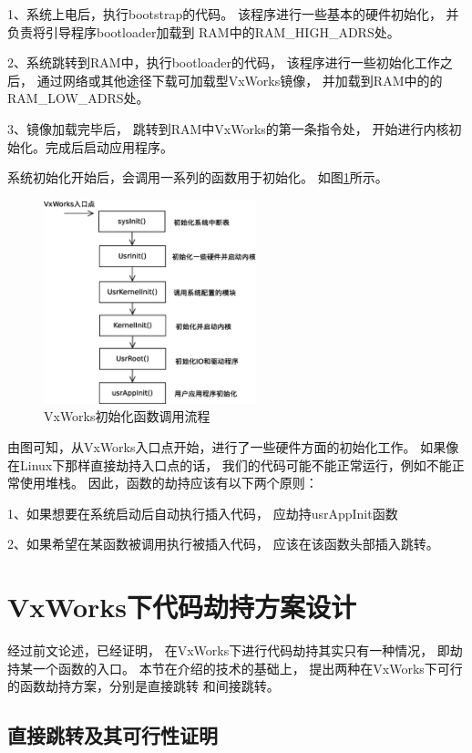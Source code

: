 1、系统上电后，执行bootstrap的代码。
该程序进行一些基本的硬件初始化，
并负责将引导程序bootloader加载到
RAM中的RAM\_HIGH\_ADRS处。

2、系统跳转到RAM中，执行bootloader的代码，
该程序进行一些初始化工作之后，
通过网络或其他途径下载可加载型VxWorks镜像，
并加载到RAM中的的RAM\_LOW\_ADRS处。

3、镜像加载完毕后，
跳转到RAM中VxWorks的第一条指令处，
开始进行内核初始化。完成后启动应用程序。

系统初始化开始后，会调用一系列的函数用于初始化。
如图\ref{init}所示。

\begin{figure}[h!]
    \centering
    \includegraphics[width=0.55\textwidth]{figure/init.eps}
    \caption{VxWorks初始化函数调用流程}
    \label{init}
\end{figure}

由图可知，从VxWorks入口点开始，进行了一些硬件方面的初始化工作。
如果像在Linux下那样直接劫持入口点的话，
我们的代码可能不能正常运行，例如不能正常使用堆栈。
因此，函数的劫持应该有以下两个原则：

1、如果想要在系统启动后自动执行插入代码，
应劫持usrAppInit函数

2、如果希望在某函数被调用执行被插入代码，
应该在该函数头部插入跳转。

\section{VxWorks下代码劫持方案设计}


经过前文论述，已经证明，
在VxWorks下进行代码劫持其实只有一种情况，
即劫持某一个函数的入口。
本节在\label{section_hijcak}介绍的技术的基础上，
提出两种在VxWorks下可行的函数劫持方案，分别是直接跳转
和间接跳转。


\subsection{直接跳转及其可行性证明}
\label{direct}

